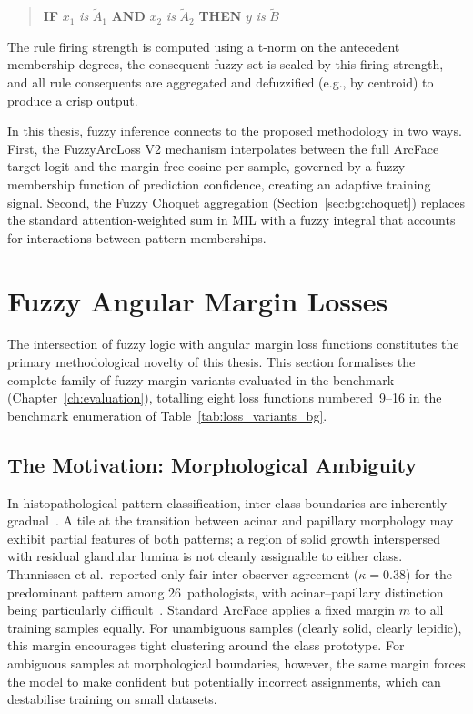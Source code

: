 \begin{quote}
\textbf{IF} $x_1$ \textit{is} $\tilde{A}_1$ \textbf{AND} $x_2$ \textit{is} $\tilde{A}_2$ \textbf{THEN} $y$ \textit{is} $\tilde{B}$
\end{quote}

The rule firing strength is computed using a t-norm on the antecedent membership degrees, the consequent fuzzy set is scaled by this firing strength, and all rule consequents are aggregated and defuzzified (e.g., by centroid) to produce a crisp output.

In this thesis, fuzzy inference connects to the proposed methodology in two ways.
First, the FuzzyArcLoss V2 mechanism interpolates between the full ArcFace target logit and the margin-free cosine per sample, governed by a fuzzy membership function of prediction confidence, creating an adaptive training signal.
Second, the Fuzzy Choquet aggregation (Section~\ref{sec:bg:choquet}) replaces the standard attention-weighted sum in MIL with a fuzzy integral that accounts for interactions between pattern memberships.


\section{Fuzzy Angular Margin Losses}
\label{sec:bg:fuzzy_margin}

The intersection of fuzzy logic with angular margin loss functions constitutes the primary methodological novelty of this thesis.
This section formalises the complete family of fuzzy margin variants evaluated in the benchmark (Chapter~\ref{ch:evaluation}), totalling eight loss functions numbered~9--16 in the benchmark enumeration of Table~\ref{tab:loss_variants_bg}.

\subsection{The Motivation: Morphological Ambiguity}
\label{sec:bg:fuzzy_margin:motivation}

In histopathological pattern classification, inter-class boundaries are inherently gradual~\cite{thunnissen2012reproducibility}.
A tile at the transition between acinar and papillary morphology may exhibit partial features of both patterns; a region of solid growth interspersed with residual glandular lumina is not cleanly assignable to either class.
Thunnissen et al.\ reported only fair inter-observer agreement ($\kappa = 0.38$) for the predominant pattern among 26~pathologists, with acinar--papillary distinction being particularly difficult~\cite{thunnissen2012reproducibility}.
Standard ArcFace applies a fixed margin $m$ to all training samples equally.
For unambiguous samples (clearly solid, clearly lepidic), this margin encourages tight clustering around the class prototype.
For ambiguous samples at morphological boundaries, however, the same margin forces the model to make confident but potentially incorrect assignments, which can destabilise training on small datasets.

